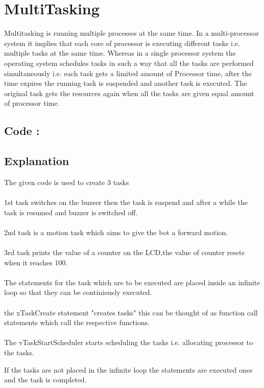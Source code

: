\documentclass[11pt,a4paper]{book}
\begin{document}
	\section{MultiTasking}
	Multitasking is running multiple processes at the same time.
	In a multi-processor system it implies that each core of processor is executing different tasks i.e. multiple tasks at the same time.
	Whereas in a single processor system the operating system schedules tasks in such a way that all the tasks are performed simultaneously i.e. each task gets a limited amount of Processor time, after the time expires the running task is suspended and another task is executed. The original task gets the resources again when all the tasks are given equal amount of processor time. 
	
	\subsection{Code :}
	
	
	\subsection{Explanation}
	The given code is used to create 3 tasks 
	\\
	\\
	1st task switches on the buzeer then the task is suspend and after a while the task is resumed and buzzer is switched off.
	\\
	\\
	2nd task is a motion task which aims to give the bot a forward motion.
	\\
	\\
	3rd task prints the value of a counter on the LCD,the value of counter resets when it reaches 100.
	\\
	\\
	The statements for the task which are to be executed are placed inside an infinite loop so that they can be continiously executed.
	\\
	\\
	the xTaskCreate statement "creates tasks" this can be thought of as function call statements which call the respective functions.
	\\ 
	\\
	The vTaskStartScheduler starts scheduling the tasks i.e. allocating processor to the tasks.
	
	If the tasks are not placed in the infinite loop the statements are executed ones and the task is completed.
	
\end{document}
